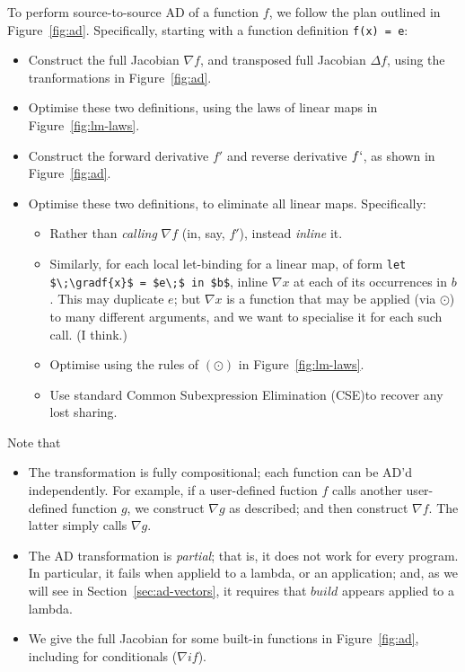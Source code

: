 \documentclass[sigplan,review]{acmart}
\newcommand{\gradf}[1]{\nabla\! \mathit{#1}}  %
\newcommand{\gradft}[1]{\Delta\mathit{#1}}  %
\newcommand{\fwdDf}[1]{f'}  %
\newcommand{\revDf}[1]{f`}  %
\newcommand{\iffun}{\mathit{if}}
\newcommand{\buildfun}{\mathit{build}}
\newcommand{\lmapply}{\odot}   %
\newcommand{\lmcomp}{\,\circ\,}   %
\begin{document}
To perform source-to-source AD of a function $f$, we follow the plan
outlined in Figure~\ref{fig:ad}.  Specifically, starting with a
function definition \lstinline|f(x) = e|:

\begin{itemize}
\item Construct the full Jacobian $\gradf{f}$, and transposed full Jacobian $\gradft{f}$,
  using the tranformations in Figure~\ref{fig:ad}.
\item Optimise these two definitions, using the laws of linear maps
  in Figure~\ref{fig:lm-laws}.
\item Construct the forward derivative $\fwdDf{f}$ and reverse derivative $\revDf{f}$,
  as shown in Figure~\ref{fig:ad}.
\item Optimise these two definitions, to eliminate all linear maps. Specifically:
  \begin{itemize}
    \item Rather than \emph{calling} $\gradf{f}$ (in, say, $\fwdDf{f}$), instead \emph{inline} it.
    \item Similarly, for each local let-binding for a linear map, of form \lstinline|let $\;\gradf{x}$ = $e\;$ in $b$|,
      inline $\gradf{x}$ at each of its occurrences in $b$. This may duplicate $e$; but $\gradf{x}$ is a function
      that may be applied (via $\lmapply$) to many different arguments, and we want to specialise it for each
      such call.  (I think.)
    \item Optimise using the rules of $(\lmapply)$ in Figure~\ref{fig:lm-laws}.
    \item Use standard Common Subexpression Elimination (CSE)to recover any lost sharing.
  \end{itemize}
\end{itemize}

Note that
\begin{itemize}
\item The transformation is fully compositional; each function can be AD'd independently.
  For example, if a user-defined
  fuction $f$ calls another user-defined function $g$, we construct $\gradf{g}$ as
  described; and then construct $\gradf{f}$. The latter simply calls $\gradf{g}$.

\item The AD transformation is \emph{partial}; that is, it does not work for every
  program. In particular, it fails when applield to a lambda, or an application; and,
  as we will see in Section~\ref{sec:ad-vectors}, it requires that $\buildfun$ appears
  applied to a lambda.

\item We give the full Jacobian for some built-in functions in Figure~\ref{fig:ad}, including
  for conditionals ($\gradf{\iffun}$).
\end{itemize}
\end{document}
